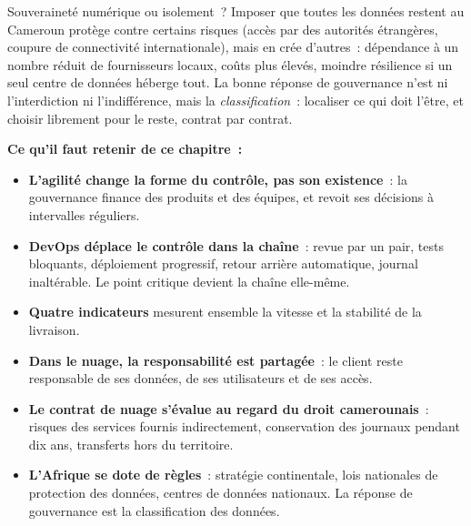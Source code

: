 \begin{boiteRemarque}{Souveraineté numérique ou isolement~?}
Imposer que toutes les données restent au Cameroun protège contre
certains risques (accès par des autorités étrangères, coupure de
connectivité internationale), mais en crée d'autres~: dépendance à un
nombre réduit de fournisseurs locaux, coûts plus élevés, moindre
résilience si un seul centre de données héberge tout. La bonne réponse
de gouvernance n'est ni l'interdiction ni l'indifférence, mais la
\emph{classification}~: localiser ce qui doit l'être, et choisir
librement pour le reste, contrat par contrat.
\end{boiteRemarque}

\separateur

\begin{boxresume}
\textbf{Ce qu'il faut retenir de ce chapitre~:}
\begin{itemize}
    \item \textbf{L'agilité change la forme du contrôle, pas son
          existence}~: la gouvernance finance des produits et des équipes,
          et revoit ses décisions à intervalles réguliers.
    \item \textbf{DevOps déplace le contrôle dans la chaîne}~: revue par un
          pair, tests bloquants, déploiement progressif, retour arrière
          automatique, journal inaltérable. Le point critique devient la
          chaîne elle-même.
    \item \textbf{Quatre indicateurs} mesurent ensemble la vitesse et la
          stabilité de la livraison.
    \item \textbf{Dans le nuage, la responsabilité est partagée}~: le client
          reste responsable de ses données, de ses utilisateurs et de ses
          accès.
    \item \textbf{Le contrat de nuage s'évalue au regard du droit
          camerounais}~: risques des services fournis indirectement,
          conservation des journaux pendant dix ans, transferts hors du
          territoire.
    \item \textbf{L'Afrique se dote de règles}~: stratégie continentale,
          lois nationales de protection des données, centres de données
          nationaux. La réponse de gouvernance est la classification des
          données.
\end{itemize}
\end{boxresume}

